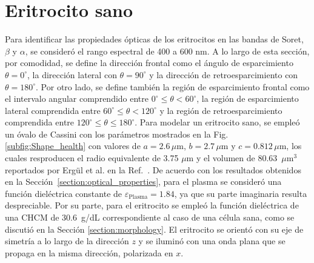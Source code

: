 
\section{Eritrocito sano}
\label{section:Res_Eritrocito_Sano}
\vspace{-0.3cm}

Para identificar las propiedades ópticas de los eritrocitos en las bandas de Soret, $\beta$ y $\alpha$, se consideró el rango espectral de 400  a 600 nm.  A lo largo de esta sección, por comodidad, se define la dirección frontal como el ángulo de esparcimiento $\theta=0^\circ$, la dirección lateral con $\theta=90^\circ$ y la dirección de retroesparcimiento con $\theta=180^\circ$. Por otro lado, se define también la región de esparcimiento frontal como el intervalo angular comprendido entre $0^\circ\leq\theta<60^\circ$, la región de esparcimiento lateral comprendida entre $60^\circ\leq\theta<120^\circ$ y la región de retroesparcimiento comprendida entre $120^\circ\leq\theta\leq180^\circ$. Para modelar un eritrocito sano, se empleó un óvalo de Cassini con los parámetros mostrados en la Fig. \ref{subfig:Shape_health} con valores de $a=2.6\,\mu\text{m}$, $b=2.7\,\mu\text{m}$ y $c=0.812\,\mu\text{m}$, los cuales resproducen el radio equivalente de 3.75 $\mu$m y el volumen de 80.63~$\mu\text{m}^3$ reportados por Ergül et al. en la Ref.~\cite{ergulComputationalStudyScattering2010}. De acuerdo con los resultados obtenidos en la Sección~\ref{section:optical_properties}, para el plasma se consideró una función dieléctrica constante de $\varepsilon_{\text{Plasma}}=1.84$, ya que su parte imaginaria resulta despreciable. Por su parte, para el eritrocito se empleó la función dieléctrica de una CHCM de 30.6~g/dL correspondiente al caso de una célula sana, como se discutió en la Sección \ref{section:morphology}. El eritrocito se orientó con su eje de simetría a lo largo de la dirección $z$ y se iluminó con una onda plana que se propaga en la misma dirección, polarizada en $x$.

